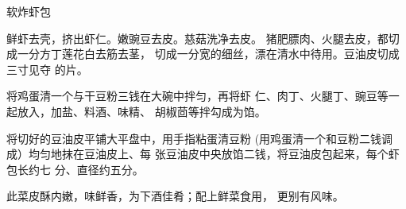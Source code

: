 \begin{recipe}{软炸虾包}

\ingredients




\cooking

\step 	鲜虾去壳，挤出虾仁。嫩豌豆去皮。慈菇洗净去皮。 猪肥膘肉、火腿去皮，都切成一分方丁莲花白去筋去茎， 切成一分宽的细丝，漂在清水中待用。豆油皮切成三寸见夺 的片。

\step 	将鸡蛋清一个与干豆粉三钱在大碗中拌匀，再将虾 仁、肉丁、火腿丁、豌豆等一起放入，加盐、料酒、味精、 胡椒茴等拌勾成为馅。

将切好的豆油皮平铺大平盘中，用手指粘蛋清豆粉 (用鸡蛋清一个和豆粉二钱调成）均匀地抹在豆油皮上、每 张豆油皮中央放馅二钱，将豆油皮包起来，每个虾包长约七 分、直径约五分。

\notes

此菜皮酥内嫩，味鲜香，为下酒佳肴；配上鲜菜食用， 更别有风味。

\end{recipe}


